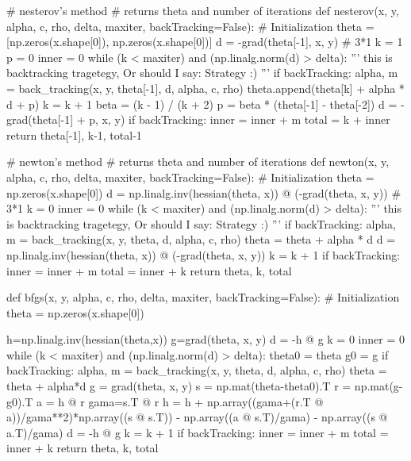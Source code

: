 \documentclass[12pt, a4 paper]{article}
\begin{document}
\begin{python}
# nesterov's method
# returns theta and number of iterations
def nesterov(x, y, alpha, c, rho, delta, maxiter, backTracking=False):
    # Initialization
    theta = [np.zeros(x.shape[0]), np.zeros(x.shape[0])]
    d = -grad(theta[-1], x, y) # 3*1
    k = 1
    p = 0
    inner = 0
    while (k < maxiter) and (np.linalg.norm(d) > delta):
        '''
        this is backtracking tragetegy, Or should I say: Strategy :)
        '''
        if backTracking:
            alpha, m = back_tracking(x, y, theta[-1], d, alpha, c, rho)
        theta.append(theta[k] + alpha * d + p)
        k = k + 1
        beta = (k - 1) / (k + 2)
        p = beta * (theta[-1] - theta[-2])
        d = -grad(theta[-1] + p, x, y)
        if backTracking:
            inner = inner + m
    total = k + inner
    return theta[-1], k-1, total-1



# newton's method
# returns theta and number of iterations
def newton(x, y, alpha, c, rho, delta, maxiter, backTracking=False):
    # Initialization
    theta = np.zeros(x.shape[0])
    d = np.linalg.inv(hessian(theta, x)) @ (-grad(theta, x, y)) # 3*1
    k = 0
    inner = 0
    while (k < maxiter) and (np.linalg.norm(d) > delta):
        '''
        this is backtracking tragetegy, Or should I say: Strategy :)
        '''
        if backTracking:
            alpha, m = back_tracking(x, y, theta, d, alpha, c, rho)
        theta = theta + alpha * d
        d = np.linalg.inv(hessian(theta, x)) @ (-grad(theta, x, y))
        k = k + 1
        if backTracking:
            inner = inner + m
    total = inner + k
    return theta, k, total

def bfgs(x, y, alpha, c, rho, delta, maxiter, backTracking=False):
    # Initialization    
    theta = np.zeros(x.shape[0])

    h=np.linalg.inv(hessian(theta,x))
    g=grad(theta, x, y)
    d = -h @ g  
    k = 0
    inner = 0
    while (k < maxiter) and (np.linalg.norm(d) > delta):
        theta0 = theta
        g0 = g
        if backTracking:
            alpha, m = back_tracking(x, y, theta, d, alpha, c, rho)
        theta = theta + alpha*d
        g = grad(theta, x, y)
        s = np.mat(theta-theta0).T
        r = np.mat(g-g0).T
        a = h @ r
        gama=s.T @ r
        h = h + np.array((gama+(r.T @ a))/gama**2)*np.array((s @ s.T)) - np.array((a @ s.T)/gama) - np.array((s @ a.T)/gama)
        d = -h @ g
        k = k + 1
        if backTracking:
            inner = inner + m
        total = inner + k
    return theta, k, total  



\end{python}
\end{document}
